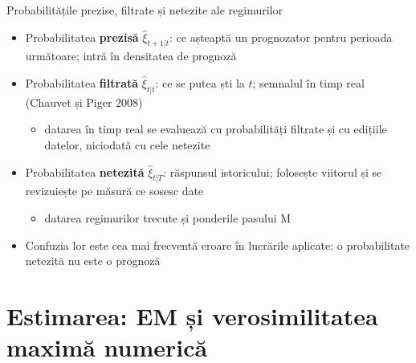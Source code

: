 \begin{frame}{Probabilitățile prezise, filtrate și netezite ale regimurilor}
\itemsize{\small}
\begin{itemize}
    \item Probabilitatea \textbf{prezisă} $\hat\xi_{t+1|t}$: ce așteaptă un prognozator pentru perioada următoare; intră în densitatea de prognoză
    \item Probabilitatea \textbf{filtrată} $\hat\xi_{t|t}$: ce se putea ști la $t$; semnalul în timp real (Chauvet și Piger 2008)
    \begin{itemize}
        \item datarea în timp real se evaluează cu probabilități filtrate și cu edițiile datelor, niciodată cu cele netezite
    \end{itemize}
    \item Probabilitatea \textbf{netezită} $\hat\xi_{t|T}$: răspunsul istoricului; folosește viitorul și se revizuiește pe măsură ce sosesc date
    \begin{itemize}
        \item datarea regimurilor trecute și ponderile pasului M
    \end{itemize}
    \item Confuzia lor este cea mai frecventă eroare în lucrările aplicate: o probabilitate netezită nu este o prognoză
\end{itemize}
\end{frame}


\section{Estimarea: EM și verosimilitatea maximă numerică}

